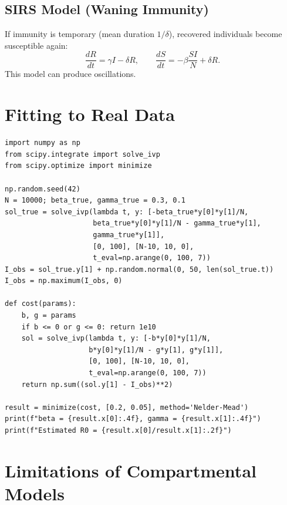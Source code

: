 \subsection{SIRS Model (Waning Immunity)}

If immunity is temporary (mean duration $1/\delta$), recovered
individuals become susceptible again:
\[
  \frac{dR}{dt} = \gamma I - \delta R, \qquad
  \frac{dS}{dt} = -\beta\frac{SI}{N} + \delta R.
\]
This model can produce oscillations.

\section{Fitting to Real Data}

\begin{codeblock}[title=\textbf{SIR fitting to data}]
\begin{verbatim}
import numpy as np
from scipy.integrate import solve_ivp
from scipy.optimize import minimize

np.random.seed(42)
N = 10000; beta_true, gamma_true = 0.3, 0.1
sol_true = solve_ivp(lambda t, y: [-beta_true*y[0]*y[1]/N,
                     beta_true*y[0]*y[1]/N - gamma_true*y[1],
                     gamma_true*y[1]],
                     [0, 100], [N-10, 10, 0],
                     t_eval=np.arange(0, 100, 7))
I_obs = sol_true.y[1] + np.random.normal(0, 50, len(sol_true.t))
I_obs = np.maximum(I_obs, 0)

def cost(params):
    b, g = params
    if b <= 0 or g <= 0: return 1e10
    sol = solve_ivp(lambda t, y: [-b*y[0]*y[1]/N,
                    b*y[0]*y[1]/N - g*y[1], g*y[1]],
                    [0, 100], [N-10, 10, 0],
                    t_eval=np.arange(0, 100, 7))
    return np.sum((sol.y[1] - I_obs)**2)

result = minimize(cost, [0.2, 0.05], method='Nelder-Mead')
print(f"beta = {result.x[0]:.4f}, gamma = {result.x[1]:.4f}")
print(f"Estimated R0 = {result.x[0]/result.x[1]:.2f}")
\end{verbatim}
\end{codeblock}

\section{Limitations of Compartmental Models}

